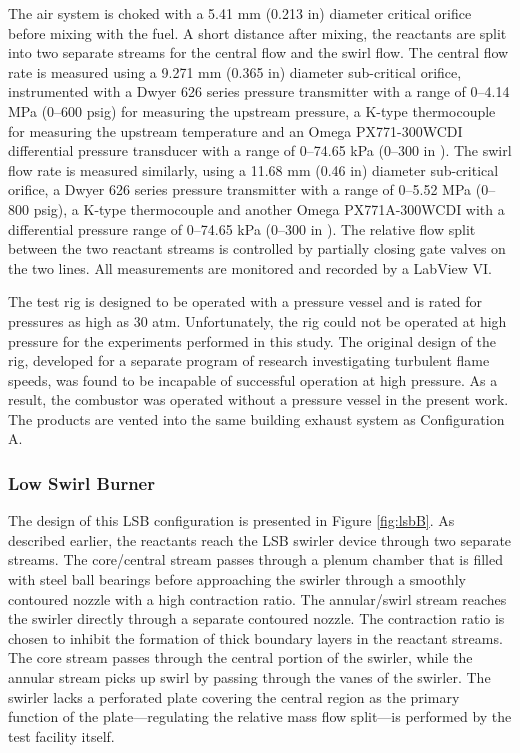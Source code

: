 The air system is choked with a 5.41 mm (0.213 in) diameter critical orifice before mixing with the fuel.
A short distance after mixing, the reactants are split into two separate streams for the central flow and the swirl flow.
The central flow rate is measured using a 9.271 mm (0.365 in) diameter sub-critical orifice, instrumented with a Dwyer 626 series pressure transmitter with a range of 0--4.14 MPa (0--600 psig) for measuring the upstream pressure, a K-type thermocouple for measuring the upstream temperature and an Omega PX771-300WCDI differential pressure transducer with a range of 0--74.65 kPa (0--300 in ).
The swirl flow rate is measured similarly, using a 11.68 mm (0.46 in) diameter sub-critical orifice, a Dwyer 626 series pressure transmitter with a range of 0--5.52 MPa (0--800 psig), a K-type thermocouple and another Omega PX771A-300WCDI with a differential pressure range of 0--74.65 kPa (0--300 in ).
The relative flow split between the two reactant streams is controlled by partially closing gate valves on the two lines.
All measurements are monitored and recorded by a LabView VI.

The test rig is designed to be operated with a pressure vessel and is rated for pressures as high as 30 atm.
Unfortunately, the rig could not be operated at high pressure for the experiments performed in this study. The original design of the rig, developed for a separate program of research investigating turbulent flame speeds, was found to be incapable of successful operation at high pressure.
As a result, the combustor was operated without a pressure vessel in the present work.
The products are vented into the same building exhaust system as Configuration A.

\subsubsection{Low Swirl Burner}
\label{subsubsec:configuration-b-low-swirl-burner}



The design of this LSB configuration is presented in Figure \ref{fig:lsbB}.
As described earlier, the reactants reach the LSB swirler device through two separate streams.
The core/central stream passes through a plenum chamber that is filled with steel ball bearings before approaching the swirler through a smoothly contoured nozzle with a high contraction ratio.
The annular/swirl stream reaches the swirler directly through a separate contoured nozzle.
The contraction ratio is chosen to inhibit the formation of thick boundary layers in the reactant streams.
The core stream passes through the central portion of the swirler, while the annular stream picks up swirl by passing through the vanes of the swirler.
The swirler lacks a perforated plate covering the central region as the primary function of the plate---regulating the relative mass flow split---is performed by the test facility itself.


